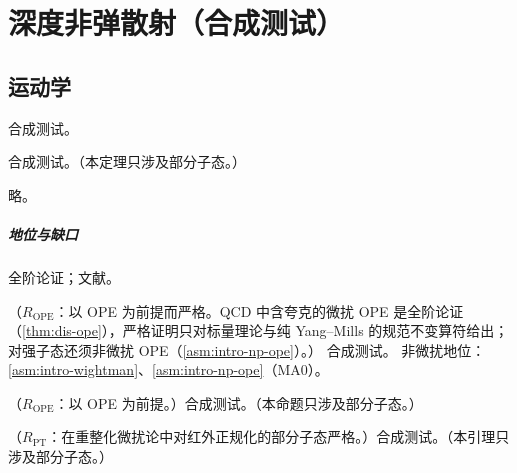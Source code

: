 \chapter{深度非弹散射（合成测试）}\label{ch:dis}

\section{运动学}\label{sec:dis-kin}

\begin{definition}\label{def:dis-kinematics}
合成测试。
\end{definition}

\begin{theorem}\label{thm:dis-ope}
合成测试。（本定理只涉及部分子态。）
\end{theorem}
\begin{proofsketch}略。\end{proofsketch}

\paragraph{地位与缺口}全阶论证；文献\cite{Collins2011}。

\begin{theorem}\label{thm:dis-moments}
（$R_{\mathrm{OPE}}$：以 OPE 为前提而严格。QCD 中含夸克的微扰 OPE 是全阶论证（\cref{thm:dis-ope}），严格证明只对标量理论与纯 Yang--Mills 的规范不变算符给出；对强子态还须非微扰 OPE（\cref{asm:intro-np-ope}）。）
合成测试。
非微扰地位：\cref{asm:intro-wightman}、\cref{asm:intro-np-ope}（MA0）。
\end{theorem}

\begin{proposition}\label{prop:dis-short}
（$R_{\mathrm{OPE}}$：以 OPE 为前提。）合成测试。（本命题只涉及部分子态。）
\end{proposition}

\begin{lemma}\label{lem:dis-ptlemma}
（$R_{\mathrm{PT}}$：在重整化微扰论中对红外正规化的部分子态严格。）合成测试。（本引理只涉及部分子态。）
\end{lemma}

